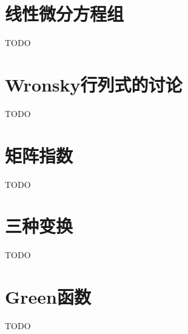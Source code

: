 














\section{线性微分方程组}

TODO







% 



\section{Wronsky行列式的讨论}
TODO


\section{矩阵指数}
TODO
\section{三种变换}
TODO
\section{Green函数}
TODO
 
